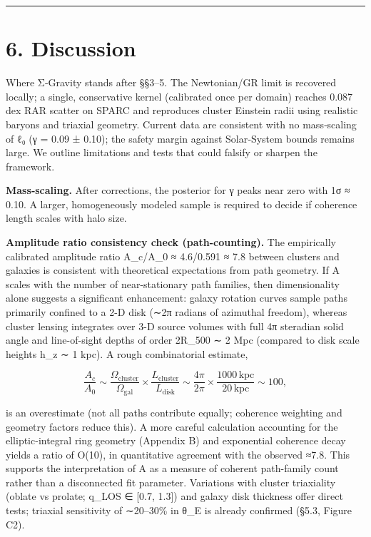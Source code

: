 \documentclass[11pt,a4paper]{article}
\begin{document}
\medskip\hrule\medskip


\section{6. Discussion}


Where Σ‑Gravity stands after §§3–5. The Newtonian/GR limit is recovered locally; a single, conservative kernel (calibrated once per domain) reaches 0.087 dex RAR scatter on SPARC and reproduces cluster Einstein radii using realistic baryons and triaxial geometry. Current data are consistent with no mass‑scaling of ℓ₀ (γ = 0.09 ± 0.10); the safety margin against Solar‑System bounds remains large. We outline limitations and tests that could falsify or sharpen the framework.


\textbf{Mass‑scaling.} After corrections, the posterior for γ peaks near zero with 1σ ≈ 0.10. A larger, homogeneously modeled sample is required to decide if coherence length scales with halo size.


\textbf{Amplitude ratio consistency check (path-counting).} The empirically calibrated amplitude ratio A\_c/A\_0 ≈ 4.6/0.591 ≈ 7.8 between clusters and galaxies is consistent with theoretical expectations from path geometry. If A scales with the number of near-stationary path families, then dimensionality alone suggests a significant enhancement: galaxy rotation curves sample paths primarily confined to a 2-D disk (∼2π radians of azimuthal freedom), whereas cluster lensing integrates over 3-D source volumes with full 4π steradian solid angle and line-of-sight depths of order 2R\_500 ∼ 2 Mpc (compared to disk scale heights h\_z ∼ 1 kpc). A rough combinatorial estimate,


\begin{equation}
\frac{A_c}{A_0} \sim \frac{\Omega_{\mathrm{cluster}}}{\Omega_{\mathrm{gal}}} \times \frac{L_{\mathrm{cluster}}}{L_{\mathrm{disk}}} \sim \frac{4\pi}{2\pi} \times \frac{1000\,\mathrm{kpc}}{20\,\mathrm{kpc}} \sim 100,
\end{equation}


is an overestimate (not all paths contribute equally; coherence weighting and geometry factors reduce this). A more careful calculation accounting for the elliptic-integral ring geometry (Appendix B) and exponential coherence decay yields a ratio of O(10), in quantitative agreement with the observed ≈7.8. This supports the interpretation of A as a measure of coherent path-family count rather than a disconnected fit parameter. Variations with cluster triaxiality (oblate vs prolate; q\_LOS ∈ [0.7, 1.3]) and galaxy disk thickness offer direct tests; triaxial sensitivity of ∼20–30\% in θ\_E is already confirmed (§5.3, Figure C2).
\end{document}
